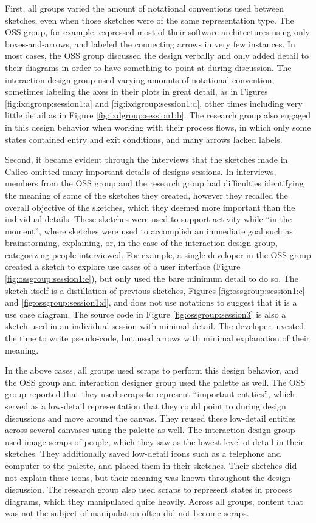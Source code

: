 \documentclass[12pt,fleqn]{ucithesis}
\begin{document}
First, all groups varied the amount of notational conventions used between sketches, even when those sketches were of the same representation type. The OSS group, for example, expressed most of their software architectures using only boxes-and-arrows, and labeled the connecting arrows in very few instances. In most cases, the OSS group discussed the design verbally and only added detail to their diagrams in order to have something to point at during discussion. The interaction design group used varying amounts of notational convention, sometimes labeling the axes in their plots in great detail, as in Figures \ref{fig:ixdgroup:session1:a} and \ref{fig:ixdgroup:session1:d}, other times including very little detail as in Figure \ref{fig:ixdgroup:session1:b}. The research group also engaged in this design behavior when working with their process flows, in which only some states contained entry and exit conditions, and many arrows lacked labels. 

Second, it became evident through the interviews that the sketches made in Calico omitted many important details of designs sessions. In interviews, members from the OSS group and the research group had difficulties identifying the meaning of some of the sketches they created, however they recalled the overall objective of the sketches, which they deemed more important than the individual details. These sketches were used to support activity while ``in the moment'', where sketches were used to accomplish an immediate goal such as brainstorming, explaining, or, in the case of the interaction design group, categorizing people interviewed. For example, a single developer in the OSS group created a sketch to explore use cases of a user interface (Figure \ref{fig:ossgroup:session1:e}), but only used the bare minimum detail to do so. The sketch itself is a distillation of previous sketches, Figures \ref{fig:ossgroup:session1:c} and \ref{fig:ossgroup:session1:d}, and does not use notations to suggest that it is a use case diagram. The source code in Figure \ref{fig:ossgroup:session3} is also a sketch used in an individual session with minimal detail. The developer invested the time to write pseudo-code, but used arrows with minimal explanation of their meaning. 

In the above cases, all groups used scraps to perform this design behavior, and the OSS group and interaction designer group used the palette as well. The OSS group reported that they used scraps to represent ``important entities'', which served as a low-detail representation that they could point to during design discussions and move around the canvas. They reused these low-detail entities across several canvases using the palette as well. The interaction design group used image scraps of people, which they saw as the lowest level of detail in their sketches. They additionally saved low-detail icons such as a telephone and computer to the palette, and placed them in their sketches. Their sketches did not explain these icons, but their meaning was known throughout the design discussion. The research group also used scraps to represent states in process diagrams, which they manipulated quite heavily. Across all groups, content that was not the subject of manipulation often did not become scraps.
\end{document}
